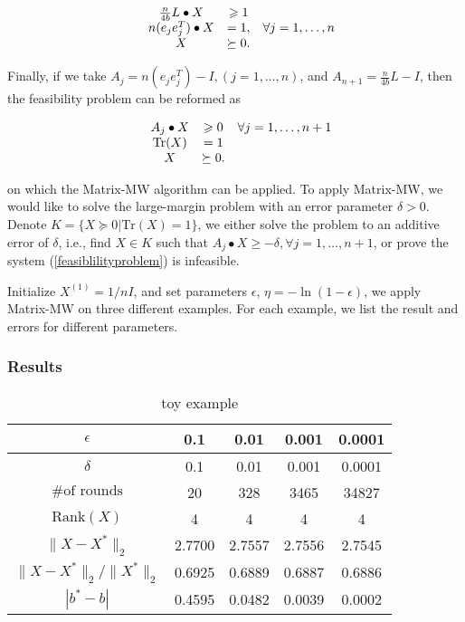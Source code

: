 \documentclass[12pt]{article}
\begin{document}
\begin{equation*}
\begin{array}{c c c c}
& \frac{n}{4b} L \bullet X & \geqslant 1 & \\
& n(e_je_j^T) \bullet X  & =  1,  & \forall j = 1,\dots, n \\ 
 & X  & \succeq  0. &
\end{array}
\end{equation*}

Finally, if we take $A_j = n(e_je_j^T) - I, (j = 1,\dots, n)$, and $A_{n+1} = \frac{n}{4b} L - I$, then the feasibility problem can be reformed as 

\begin{equation}\label{feasiblilityproblem}
\begin{array}{c c c c}
& A_j \bullet X & \geqslant 0 & \forall j = 1,\dots, n+1 \\
& \text{Tr}(X) & = 1 &\\ 
 & X  & \succeq  0. &
\end{array}
\end{equation}

on which the Matrix-MW algorithm can be applied. To apply Matrix-MW, we would like to solve the large-margin problem with an error parameter $\delta >0$. Denote $K = \{X \succeq 0 | \text{Tr}(X) = 1\}$, we either solve the problem to an additive error of $\delta$, i.e., find $X \in K$ such that $A_j \bullet X  \geqslant -\delta,  \forall j = 1,\dots, n+1$, or prove the system (\ref{feasiblilityproblem}) is infeasible.


Initialize $X^{(1)} = 1/n I$, and set parameters $\epsilon$, $\eta = -\ln(1-\epsilon)$, we apply Matrix-MW on three different examples. For each example, we list the result and errors for different parameters.




\subsubsection{Results}
\begin{table}[htbp]\label{toytable}
\centering
\begin{tabular}{||c|c|c|c|c||}
\hline
$\epsilon$ & 0.1 & 0.01 & 0.001 & 0.0001 \\
\hline
$\delta$ & 0.1 & 0.01 & 0.001 & 0.0001 \\
\hline
$\text{\# of rounds}$ & 20 & 328 & 3465  & 34827 \\
\hline
$\text{Rank} (X)$ & 4 & 4 & 4 & 4 \\
\hline
$\|X - X^*\|_2$ & 2.7700 & 2.7557 & 2.7556 & 2.7545 \\
\hline
$\|X - X^*\|_2 / \|X^*\|_2$ & 0.6925   & 0.6889 & 0.6887 & 0.6886\\
\hline
$|b^* - b|$ & 0.4595 & 0.0482 & 0.0039 & 0.0002 \\
\hline
\end{tabular}
\caption{toy example}
\end{table}
\end{document}
